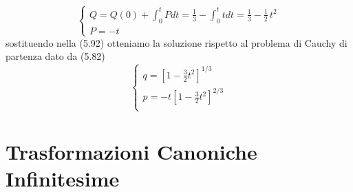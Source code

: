 \begin{equation}
	\begin{cases}
		Q = Q(0) + \int_{0}^{t} Pdt = \frac{1}{3} - \int_{0}^{t} tdt = \frac{1}{3} - \frac{1}{2} \,t^2\\
		P = -t 
	\end{cases}
\end{equation}
sostituendo nella (5.92) otteniamo la soluzione rispetto al problema di Cauchy di partenza dato da (5.82)
\begin{equation}
\begin{cases}
	q = \left[1-\frac{3}{2} t^2\right]^{1 / 3} \\
	p = -t\left[1-\frac{3}{2} t^2\right]^{2 / 3}\\
	\end{cases}
\end{equation}

\section{Trasformazioni Canoniche Infinitesime}


